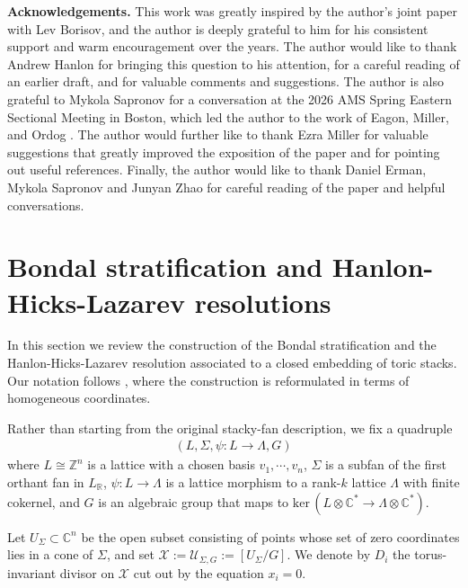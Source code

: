 \documentclass[11pt,reqno]{amsart}
\def\C {{\mathbb C}}
\def\Z {{\mathbb Z}}
\theoremstyle{definition}
\numberwithin{equation}{section}
\begin{document}
\smallskip


{\bf Acknowledgements.} This work was greatly inspired by the author's joint paper \cite{BH} with Lev Borisov, and the author is deeply grateful to him for his consistent support and warm encouragement over the years. The author would like to thank Andrew Hanlon for bringing this question to his attention, for a careful reading of an earlier draft, and for valuable comments and suggestions. The author is also grateful to Mykola Sapronov for a conversation at the 2026 AMS Spring Eastern Sectional Meeting in Boston, which led the author to the work of Eagon, Miller, and Ordog \cite{EMO}. The author would further like to thank Ezra Miller for valuable suggestions that greatly improved the exposition of the paper and for pointing out useful references. Finally, the author would like to thank Daniel Erman, Mykola Sapronov and Junyan Zhao for careful reading of the paper and helpful conversations.


\section{Bondal stratification and Hanlon-Hicks-Lazarev resolutions}\label{sec:Bondal-HHL}

In this section we review the construction of the Bondal stratification and the Hanlon-Hicks-Lazarev resolution associated to a closed embedding of toric stacks. Our notation follows \cite[\S 3]{BH}, where the construction is reformulated in terms of homogeneous coordinates.

\smallskip

Rather than starting from the original stacky-fan description, we fix a quadruple
\begin{align*}
    (L,\Sigma,\psi:L\rightarrow\Lambda,G)
\end{align*}
where $L\cong\Z^n$ is a lattice with a chosen basis $v_1,\cdots,v_n$, $\Sigma$ is a subfan of the first orthant fan in \(L_{\mathbb{R}}\), $\psi:L\rightarrow \Lambda$ is a lattice morphism to a rank-$k$ lattice $\Lambda$ with finite cokernel, and $G$ is an algebraic group that maps to $\mathrm{ker}\,(L\otimes\C^* \rightarrow \Lambda\otimes\C^*)$.

\smallskip



Let $U_{\Sigma}\subset \C^n$ be the open subset consisting of points whose set of zero coordinates lies in a cone of $\Sigma$, and set $\mathcal{X}:=\mathcal{U}_{\Sigma,G}:=[U_{\Sigma}/G]$. We denote by \(D_i\) the torus-invariant divisor on \(\mathcal{X}\) cut out by the equation \(x_i=0\).
\end{document}

